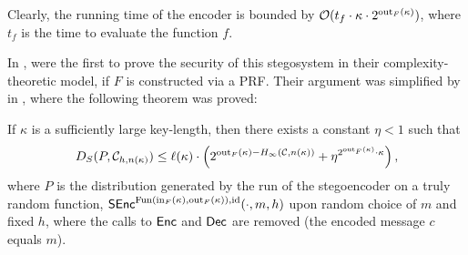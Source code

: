 

Clearly, the running time of the encoder is bounded by $\mathcal{O}(t_{f}\cdot
\kappa\cdot 2^{\operatorname{out}_{F}(\kappa)})$, where $t_{f}$ is the time to evaluate the
function $f$. 

In \cite{hopper2009provably}, \citeauthor{hopper2009provably} were the
first to prove the security of this stegosystem in their
complexity-theoretic model, if $F$ is constructed
via a \acf{PRF}.
Their argument was simplified by
\citeauthor{backes2005active} in \cite{backes2005active}, where the
following theorem was proved:
\begin{theorem}
\label{thm:backes}
If $\kappa$ is a sufficiently large key-length, then there exists a constant $\eta < 1$
such that
\begin{align*}
D_{S}(P,\mathcal{C}_{h,n(\kappa)})\leq
  \ell(\kappa)\cdot \left(2^{\operatorname{out}_{F}(\kappa)-H_{\infty}(\mathcal{C},n(\kappa))}+\eta^{2^{\operatorname{out}_{F}(\kappa)}\cdot
  \kappa}\right),
\end{align*}
where $P$ is the distribution generated by the run of the
stegoencoder on a truly random function, \ie 
$\operatorname{\mathsf{SEnc}}^{\operatorname{Fun}(\operatorname{in}_{F}(\kappa),\operatorname{out}_{F}(\kappa)),\operatorname{id}}(\cdot,m,h)$
upon random choice of $m$ and fixed $h$, where the calls to $\operatorname{\mathsf{Enc}}$ and
$\operatorname{\mathsf{Dec}}$ are removed (\ie the encoded message $c$ equals $m$).
\end{theorem}

